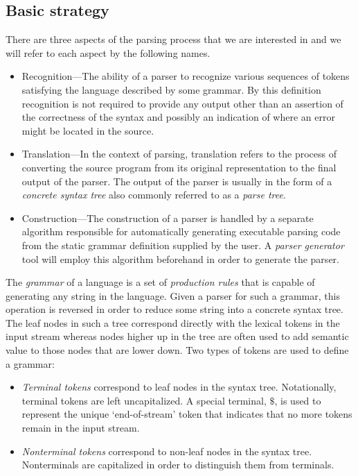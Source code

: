 \documentclass[a4paper,11pt]{article}
\begin{document}
\subsection{Basic strategy}

There are three aspects of the parsing process that we are interested in and we will refer to each aspect by the following names.
\begin{itemize}
\item Recognition---The ability of a parser to recognize various sequences of tokens satisfying the language described by some grammar. By this definition recognition is not required to provide any output other than an assertion of the correctness of the syntax and possibly an indication of where an error might be located in the source.
\item Translation---In the context of parsing, translation refers to the process of converting the source program from its original representation to the final output of the parser. The output of the parser is usually in the form of a \emph{concrete syntax tree} also commonly referred to as a \emph{parse tree}.
\item Construction---The construction of a parser is handled by a separate algorithm responsible for automatically generating executable parsing code from the static grammar definition supplied by the user. A \emph{parser generator} tool will employ this algorithm beforehand in order to generate the parser.
\end{itemize}

The \emph{grammar} of a language is a set of \emph{production rules} that is capable of generating any string in the language. 
Given a parser for such a grammar, this operation is reversed in order to reduce some string into a concrete syntax tree. 
The leaf nodes in such a tree correspond directly with the lexical tokens in the input stream whereas nodes higher up in the tree are often used to add semantic value to those nodes that are lower down.
Two types of tokens are used to define a grammar:
\begin{itemize}
\item \emph{Terminal tokens} correspond to leaf nodes in the syntax tree. Notationally, terminal tokens are left uncapitalized. A special terminal, $\$$, is used to represent the unique `end-of-stream' token that indicates that no more tokens remain in the input stream.
\item \emph{Nonterminal tokens} correspond to non-leaf nodes in the syntax tree. Nonterminals are capitalized in order to distinguish them from terminals.
\end{itemize}
\end{document}
